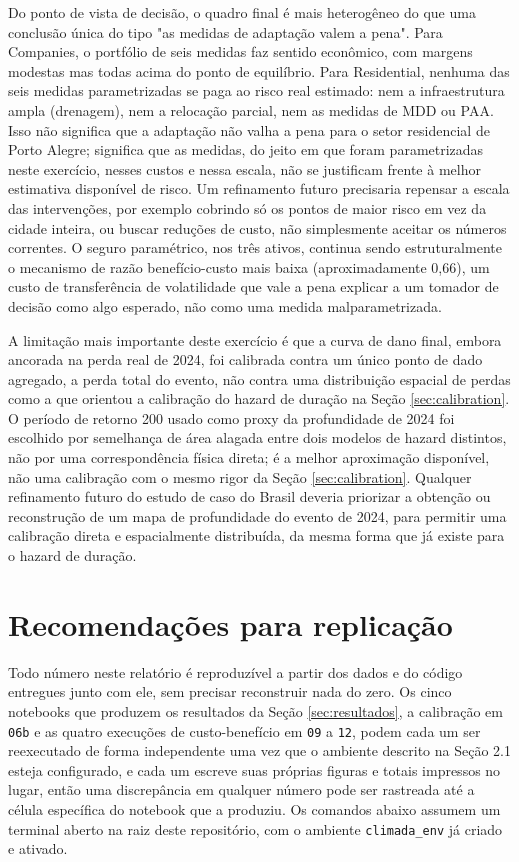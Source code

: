 \documentclass[11pt]{article}
\begin{document}
Do ponto de vista de decisão, o quadro final é mais heterogêneo do que uma conclusão única
do tipo "as medidas de adaptação valem a pena". Para Companies, o portfólio de seis
medidas faz sentido econômico, com margens modestas mas todas acima do ponto de equilíbrio.
Para Residential, nenhuma das seis medidas
parametrizadas se paga ao risco real estimado: nem a infraestrutura ampla (drenagem), nem
a relocação parcial, nem as medidas de MDD ou PAA. Isso não significa que a adaptação não
valha a pena para o setor residencial de Porto Alegre; significa que as medidas, do jeito
em que foram parametrizadas neste exercício, nesses custos e nessa escala, não se
justificam frente à melhor estimativa disponível de risco. Um refinamento futuro
precisaria repensar a escala das intervenções, por exemplo cobrindo só os pontos de maior
risco em vez da cidade inteira, ou buscar reduções de custo, não simplesmente aceitar os
números correntes. O seguro paramétrico, nos três ativos, continua sendo estruturalmente o
mecanismo de razão benefício-custo mais baixa (aproximadamente 0,66), um custo de
transferência de volatilidade que vale a pena explicar a um tomador de decisão como algo
esperado, não como uma medida malparametrizada.

A limitação mais importante deste exercício é que a curva de dano final, embora ancorada
na perda real de 2024, foi calibrada contra um único ponto de dado agregado, a perda total
do evento, não contra uma distribuição espacial de perdas como a que orientou a
calibração do hazard de duração na Seção \ref{sec:calibration}. O período de retorno 200 usado como proxy da
profundidade de 2024 foi escolhido por semelhança de área alagada entre dois modelos de
hazard distintos, não por uma correspondência física direta; é a melhor aproximação
disponível, não uma calibração com o mesmo rigor da Seção \ref{sec:calibration}. Qualquer refinamento futuro
do estudo de caso do Brasil deveria priorizar a obtenção ou reconstrução de um mapa de
profundidade do evento de 2024, para permitir uma calibração direta e espacialmente
distribuída, da mesma forma que já existe para o hazard de duração.

\section{Recomendações para replicação}

Todo número neste relatório é reproduzível a partir dos dados e do código entregues junto
com ele, sem precisar reconstruir nada do zero. Os cinco notebooks que produzem os
resultados da Seção \ref{sec:resultados}, a calibração em \texttt{06b} e as quatro
execuções de custo-benefício em \texttt{09} a \texttt{12}, podem cada um ser reexecutado
de forma independente uma vez que o ambiente descrito na Seção 2.1 esteja configurado, e
cada um escreve suas próprias figuras e totais impressos no lugar, então uma discrepância
em qualquer número pode ser rastreada até a célula específica do notebook que a produziu.
Os comandos abaixo assumem um terminal aberto na raiz deste repositório, com o ambiente
\texttt{climada\_env} já criado e ativado.
\end{document}
